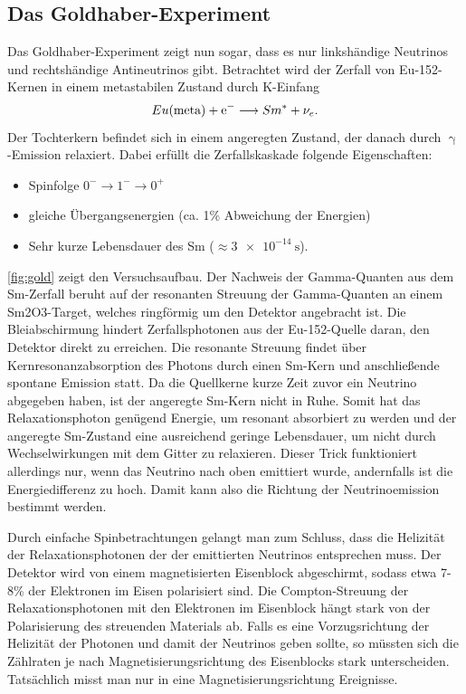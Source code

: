 \subsection{Das Goldhaber-Experiment}
Das Goldhaber-Experiment zeigt nun sogar, dass es nur linkshändige Neutrinos und rechtshändige Antineutrinos gibt.
Betrachtet wird der Zerfall von Eu-152-Kernen in einem metastabilen Zustand durch K-Einfang
\begin{equation*}
	Eu\text{(meta)} + \text{e}^- \longrightarrow Sm^* + \nu_e.
\end{equation*}
Der Tochterkern befindet sich in einem angeregten Zustand, der danach durch $\upgamma$-Emission relaxiert.
Dabei erfüllt die Zerfallskaskade folgende Eigenschaften:
\begin{itemize}
	\item Spinfolge $0^-\rightarrow 1^-\rightarrow 0^+$
	\item gleiche Übergangsenergien (ca. 1\% Abweichung der Energien)
	\item Sehr kurze Lebensdauer des Sm ($\approx\SI{3e-14}{\second}$).
\end{itemize}
\autoref{fig:gold} zeigt den Versuchsaufbau.
Der Nachweis der Gamma-Quanten aus dem Sm-Zerfall beruht auf der resonanten Streuung der Gamma-Quanten an einem Sm2O3-Target, welches ringförmig um den Detektor angebracht ist.
Die Bleiabschirmung hindert Zerfallsphotonen aus der Eu-152-Quelle daran, den Detektor direkt zu erreichen.
Die resonante Streuung findet über Kernresonanzabsorption des Photons durch einen Sm-Kern und anschließende spontane Emission statt.
Da die Quellkerne kurze Zeit zuvor ein Neutrino abgegeben haben, ist der angeregte Sm-Kern nicht in Ruhe.
Somit hat das Relaxationsphoton genügend Energie, um resonant absorbiert zu werden und der angeregte Sm-Zustand eine ausreichend geringe Lebensdauer, um nicht durch Wechselwirkungen mit dem Gitter zu relaxieren.
Dieser Trick funktioniert allerdings nur, wenn das Neutrino nach oben emittiert wurde, andernfalls ist die Energiedifferenz zu hoch.
Damit kann also die Richtung der Neutrinoemission bestimmt werden.

Durch einfache Spinbetrachtungen gelangt man zum Schluss, dass die Helizität der Relaxationsphotonen der der emittierten Neutrinos entsprechen muss.
Der Detektor wird von einem magnetisierten Eisenblock abgeschirmt, sodass etwa 7-8\% der Elektronen im Eisen polarisiert sind.
Die Compton-Streuung der Relaxationsphotonen mit den Elektronen im Eisenblock hängt stark von der Polarisierung des streuenden Materials ab.
Falls es eine Vorzugsrichtung der Helizität der Photonen und damit der Neutrinos geben sollte, so müssten sich die Zählraten je nach Magnetisierungsrichtung des Eisenblocks stark unterscheiden.
Tatsächlich misst man nur in eine Magnetisierungsrichtung Ereignisse.

